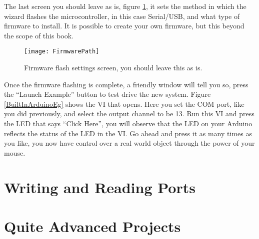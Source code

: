 The last screen you should leave as is, figure \ref{FirmwareConf}, it sets the method in which the wizard flashes the microcontroller, in this case Serial/USB, and what type of firmware to install. It is possible to create your own firmware, but this beyond the scope of this book.\\
\begin{figure}
	\centering
	\texttt{[image: FirmwarePath]}
	\caption{Firmware flash settings screen, you should leave this as is.}
	\label{FirmwareConf}
\end{figure}

Once the firmware flashing is complete, a friendly window will tell you so, press the ``Launch Example'' button to test drive the new system. Figure \ref{BuiltInArduinoEg} shows the VI that opens. %
 Here you set the COM port, like you did previously, and select the output channel to be 13. Run this VI and press the LED that says ``Click Here'', you will observe that the LED on your Arduino reflects the status of the LED in the VI. Go ahead and press it as many times as you like, you now have control over a real world object through the power of your mouse.
 
\section{Writing and Reading Ports}

\section{Quite Advanced Projects}